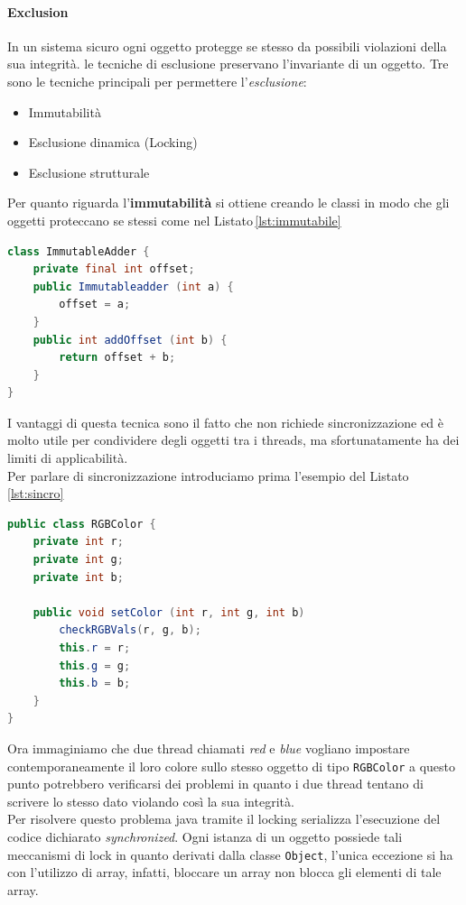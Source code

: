 \paragraph{Exclusion}
In un sistema sicuro ogni oggetto protegge se stesso da possibili violazioni della sua integrità. le tecniche di esclusione preservano l'invariante di un oggetto. Tre sono le tecniche principali per permettere l'\emph{esclusione}:
\begin{itemize}
\item Immutabilità
\item Esclusione dinamica (Locking)
\item Esclusione strutturale
\end{itemize}
Per quanto riguarda l'\textbf{immutabilità} si ottiene creando le classi in modo che gli oggetti proteccano se stessi come nel Listato\,\ref{lst:immutabile}
\begin{lstlisting}[language=Java,caption={Esempio di oggetto immutabile},label=lst:immutabile]
class ImmutableAdder {
	private final int offset;
	public Immutableadder (int a) {
		offset = a;
	}
	public int addOffset (int b) {
		return offset + b;
	}
}
\end{lstlisting}
I vantaggi di questa tecnica sono il fatto che non richiede sincronizzazione ed è molto utile per condividere degli oggetti tra i threads, ma sfortunatamente ha dei limiti di applicabilità.\\
Per parlare di sincronizzazione introduciamo prima l'esempio del Listato\,\ref{lst:sincro}
\begin{lstlisting}[language=Java,caption={Esempio sincronizzazione},label=lst:sincro]
public class RGBColor {
	private int r;
	private int g;
	private int b;
	
	public void setColor (int r, int g, int b)
		checkRGBVals(r, g, b);
		this.r = r;
		this.g = g;
		this.b = b;
	}
}
\end{lstlisting}
Ora immaginiamo che due thread chiamati \emph{red} e \emph{blue} vogliano impostare contemporaneamente il loro colore sullo stesso oggetto di tipo \texttt{RGBColor} a questo punto potrebbero verificarsi dei problemi in quanto i due thread tentano di scrivere lo stesso dato violando così la sua integrità.\\
Per risolvere questo problema java tramite il locking serializza l'esecuzione del codice dichiarato \emph{synchronized}. Ogni istanza di un oggetto possiede tali meccanismi di lock in quanto derivati dalla classe \texttt{Object}, l'unica eccezione si ha con l'utilizzo di array, infatti, bloccare un array non blocca gli elementi di tale array.\\
